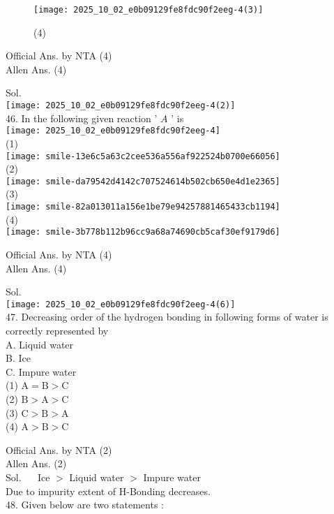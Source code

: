 \documentclass[10pt]{article}
\begin{document}
\begin{figure}[h]
\begin{center}
\captionsetup{labelformat=empty}
\caption{(4)}
  \texttt{[image: 2025\_10\_02\_e0b09129fe8fdc90f2eeg-4(3)]}
\end{center}
\end{figure}

Official Ans. by NTA (4)\\
Allen Ans. (4)

Sol.\\
\texttt{[image: 2025\_10\_02\_e0b09129fe8fdc90f2eeg-4(2)]}\\
46. In the following given reaction ' \(A\) ' is\\
\texttt{[image: 2025\_10\_02\_e0b09129fe8fdc90f2eeg-4]}\\
(1)\\
\texttt{[image: smile-13e6c5a63c2cee536a556af922524b0700e66056]}\\
(2)\\
\texttt{[image: smile-da79542d4142c707524614b502cb650e4d1e2365]}\\
(3)\\
\texttt{[image: smile-82a013011a156e1be79e94257881465433cb1194]}\\
(4)\\
\texttt{[image: smile-3b778b112b96cc9a68a74690cb5caf30ef9179d6]}

Official Ans. by NTA (4)\\
Allen Ans. (4)

Sol.\\
\texttt{[image: 2025\_10\_02\_e0b09129fe8fdc90f2eeg-4(6)]}\\
47. Decreasing order of the hydrogen bonding in following forms of water is correctly represented by\\
A. Liquid water\\
B. Ice\\
C. Impure water\\
(1) \(\mathrm{A}=\mathrm{B}>\mathrm{C}\)\\
(2) \(\mathrm{B}>\mathrm{A}>\mathrm{C}\)\\
(3) \(\mathrm{C}>\mathrm{B}>\mathrm{A}\)\\
(4) \(\mathrm{A}>\mathrm{B}>\mathrm{C}\)

Official Ans. by NTA (2)\\
Allen Ans. (2)\\
Sol. \(\quad\) Ice \(>\) Liquid water \(>\) Impure water\\
Due to impurity extent of H-Bonding decreases.\\
48. Given below are two statements :
\end{document}
